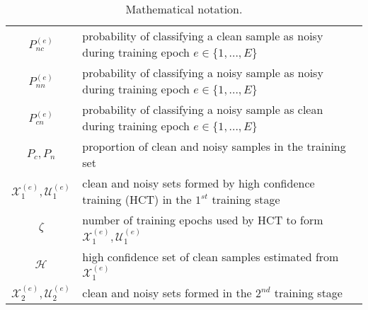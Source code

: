 \documentclass[review]{elsarticle}
\begin{document}
\begin{table}[ht]
\begin{tabular}{|c|l|}
$P_{nc}^{(e)}$ & probability of classifying a clean sample as noisy during training epoch $e \in \{1,...,E\}$\\
$P_{nn}^{(e)}$ & probability of classifying a noisy sample as noisy during training epoch $e \in \{1,...,E\}$\\
$P_{cn}^{(e)}$ & probability of classifying a noisy sample as clean during training epoch $e \in \{1,...,E\}$\\
$P_c,P_n$ &  proportion of clean and noisy
samples in the training set \\
$\mathcal{X}_1^{(e)},\mathcal{U}_1^{(e)}$ & clean and noisy sets formed by high confidence training (HCT) in the $1^{st}$ training stage\\
$\zeta$ & number of training epochs used by HCT to form $\mathcal{X}_1^{(e)},\mathcal{U}_1^{(e)}$ \\
$\mathcal{H}$ & high confidence set of clean samples estimated from $\mathcal{X}_1^{(e)}$ \\
$\mathcal{X}_2^{(e)},\mathcal{U}_2^{(e)}$ & clean and noisy sets formed in the $2^{nd}$ training stage\\
\hline
\end{tabular}
\caption{Mathematical notation.}
\label{tab:mathematical_notation}
\end{table}
\end{document}
